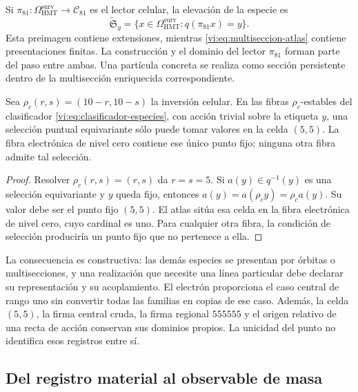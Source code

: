 Si $\pi_{81}:\Omega^{\mathrm{surv}}_{\mathrm{HMT}}\to
\mathcal C_{81}$ es el lector celular, la elevación de la especie es
\begin{equation}
 \widetilde{\mathfrak S}_y
 =\{x\in\Omega^{\mathrm{surv}}_{\mathrm{HMT}}:
                  q(\pi_{81}x)=y\}.
 \label{vi:eq:multiseccion-enriquecida}
\end{equation}
Esta preimagen contiene extensiones, mientras
\eqref{vi:eq:multiseccion-atlas} contiene presentaciones finitas. La
construcción y el dominio del lector $\pi_{81}$ forman parte del paso
entre ambas. Una partícula concreta se realiza como sección persistente
dentro de la multisección enriquecida correspondiente.

\begin{theorem}
\label{vi:thm:selector-central}
Sea $\rho_c(r,s)=(10-r,10-s)$ la inversión celular. En las fibras
$\rho_c$-estables del clasificador \eqref{vi:eq:clasificador-especies},
con acción trivial sobre la etiqueta $y$, una selección puntual
equivariante sólo puede tomar valores en la celda $(5,5)$. La fibra
electrónica de nivel cero contiene ese único punto fijo; ninguna otra
fibra admite tal selección.
\end{theorem}
\begin{proof}
Resolver $\rho_c(r,s)=(r,s)$ da $r=s=5$. Si $a(y)\in q^{-1}(y)$
es una selección equivariante y $y$ queda fijo, entonces
$a(y)=a(\rho_c y)=\rho_c a(y)$. Su valor debe ser el punto fijo
$(5,5)$. El atlas sitúa esa celda en la fibra electrónica de nivel
cero, cuyo cardinal es uno. Para cualquier otra fibra, la condición
de selección produciría un punto fijo que no pertenece a ella.
\end{proof}

La consecuencia es constructiva: las demás especies se presentan por
órbitas o multisecciones, y una realización que necesite una línea
particular debe declarar su representación y su acoplamiento. El
electrón proporciona el caso central de rango uno sin convertir todas
las familias en copias de ese caso. Además, la celda $(5,5)$, la firma
central cruda, la firma regional $555555$ y el origen relativo de una
recta de acción conservan sus dominios propios. La unicidad del punto
no identifica esos registros entre sí.

\subsection{Del registro material al observable de masa}
\label{vi:subsec:particula-observable}

